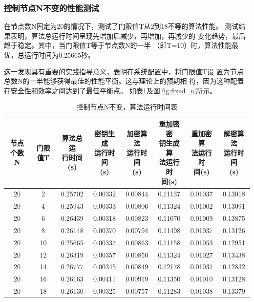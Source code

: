 \subsubsection{控制节点N不变的性能测试}

在节点数N固定为20的情况下，测试了门限值T从2到18不等的算法性能。
测试结果表明，算法总运行时间呈现先增加后减少，再增加，再减少的
变化趋势，最后趋于稳定。其中，当门限值T等于节点数N的一半
（即T=10）时，算法性能最优，总运行时间为0.25665秒。

这一发现具有重要的实践指导意义，表明在系统配置中，将门限值T设
置为节点总数N的一半能够获得最佳的性能平衡。这与理论上的预期相
符，因为这种配置在安全性和效率之间达到了最佳平衡点。
如表\ref{tab:fixed_n}及图\ref{fig:fixed_n}所示。

\begin{landscape}
	\begin{table}[htbp]
		\centering
		\caption{控制节点N不变，算法运行时间表}
		\label{tab:fixed_n}
		\begin{tabular}{|c|c|c|c|c|c|c|c|}
			\hline
			\makecell{节点个数                                                      \\N} & 门限值T & \makecell{算法总运\\行时间\\(s)} & \makecell{密钥生成\\运行时间\\(s)} & \makecell{加密算法\\运行时间\\(s)} & \makecell{重加密密\\钥生成算\\法运行时\\间(s)} & \makecell{重加密算\\法运行时\\间(s)} & \makecell{解密算法\\运行时间\\(s)} \\
			\hline
			20 & 2  & 0.25702 & 0.00332 & 0.00844 & 0.11137 & 0.01037 & 0.13018 \\
			\hline
			20 & 4  & 0.25943 & 0.00333 & 0.00806 & 0.11324 & 0.01002 & 0.13091 \\
			\hline
			20 & 6  & 0.26439 & 0.00318 & 0.00823 & 0.11070 & 0.01009 & 0.13875 \\
			\hline
			20 & 8  & 0.26148 & 0.00370 & 0.00794 & 0.11498 & 0.01037 & 0.13126 \\
			\hline
			20 & 10 & 0.25665 & 0.00337 & 0.00863 & 0.11158 & 0.01053 & 0.12951 \\
			\hline
			20 & 12 & 0.26319 & 0.00357 & 0.00850 & 0.11324 & 0.01027 & 0.13438 \\
			\hline
			20 & 14 & 0.26777 & 0.00345 & 0.00849 & 0.12178 & 0.01031 & 0.12832 \\
			\hline
			20 & 16 & 0.26163 & 0.00411 & 0.00919 & 0.11350 & 0.01010 & 0.13128 \\
			\hline
			20 & 18 & 0.26130 & 0.00325 & 0.00757 & 0.11283 & 0.01038 & 0.13379 \\
			\hline
		\end{tabular}
	\end{table}
\end{landscape}

